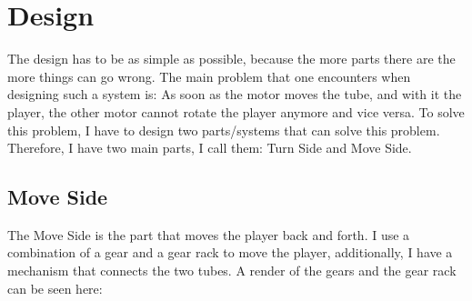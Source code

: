 \section{Design}\label{sec:design}
The design has to be as simple as possible, because the more parts there are the more things can go wrong.
The main problem that one encounters when designing such a system is:
As soon as the motor moves the tube, and with it the player, the other motor cannot rotate the player anymore and vice versa.
To solve this problem, I have to design two parts/systems that can solve this problem.
Therefore, I have two main parts, I call them: Turn Side and Move Side.

\subsection{Move Side}\label{subsec:move-side}
The Move Side is the part that moves the player back and forth.
I use a combination of a gear and a gear rack to move the player, additionally, I have a mechanism that connects the two tubes.
A render of the gears and the gear rack can be seen here:\\

